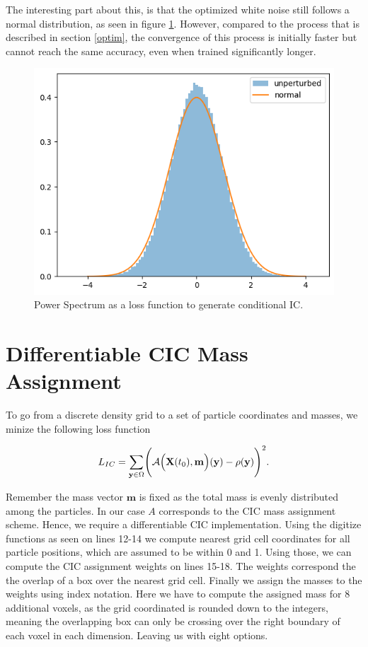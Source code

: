 \documentclass{article}
\begin{document}
{\begin{appendices}
The interesting part about this, is that the optimized white noise still follows a normal distribution, as seen in figure \ref{fig:white-distr}. However, compared to the process that is described in section \ref{optim}, the convergence of this process is initially faster but cannot reach the same accuracy, even when trained significantly longer.

\begin{figure}[h]
    \centering
    \includegraphics[width=0.5\linewidth]{img/noise.png}
    \caption{Power Spectrum as a loss function to generate conditional IC.}
    \label{fig:white-distr}
\end{figure}


\newpage
\section{Differentiable CIC Mass Assignment}
\label{inverse-map}

To go from a discrete density grid to a set of particle coordinates and masses, we minize the following loss function

\begin{equation}
    L_{IC} = \sum_{\mathbf{y} \in \Omega} \Biggl(\mathcal{A}\Bigl(\mathbf{X}(t_0), \mathbf{m}\Bigr)(\mathbf{y}) - \rho(\mathbf{y})\Biggr)^2.
\end{equation}

Remember the mass vector $\mathbf{m}$ is fixed as the total mass is evenly distributed among the particles. In our case $A$ corresponds to the CIC mass assignment scheme. Hence, we require a differentiable CIC implementation. Using the digitize functions as seen on lines 12-14 we compute nearest grid cell coordinates for all particle positions, which are assumed to be within 0 and 1. Using those, we can compute the CIC assignment weights on lines 15-18. The weights correspond the the overlap of a box over the nearest grid cell. Finally we assign the masses to the weights using index notation. Here we have to compute the assigned mass for 8 additional voxels, as the grid coordinated is rounded down to the integers, meaning the overlapping box can only be crossing over the right boundary of each voxel in each dimension. Leaving us with eight options.


\end{appendices}}
\end{document}
